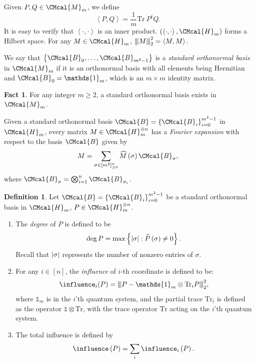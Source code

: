 \documentclass[10pt,a4paper]{article}
\def\B{\CMcal{B}}
\def\H{\CMcal{H}}
\def\M{\CMcal{M}}
\theoremstyle{plain}
\theoremstyle{definition}
\newtheorem{definition}[theorem]{Definition}
\newtheorem{fact}[theorem]{Fact}
\newcommand {\set} [1] {\ensuremath{ \left\lbrace #1 \right\rbrace }}
\newcommand {\innerproduct} [2] {\ensuremath{\left \langle #1 , #2 \right \rangle}}
\newcommand {\br} [1] {\ensuremath{ \left( #1 \right) }}
\DeclarePairedDelimiter{\abs}{\lvert}{\rvert}
\newcommand{\nnorm}[1]{{\left\vert\kern-0.25ex\left\vert\kern-0.25ex\left\vert #1
		\right\vert\kern-0.25ex\right\vert\kern-0.25ex\right\vert}}
\newcommand {\Tr} {\ensuremath{ \mathrm{Tr} }}
\newcommand {\id} {\ensuremath{\mathds{1}}}
\newcommand{\1}{\mathbb{1}} %
\begin{document}
	Given $P,Q\in\M_m$, we define
	\begin{equation}\label{eqn:innerproduct}	
	\innerproduct{P}{Q}=\frac{1}{m}\Tr~P^{\dagger}Q.
	\end{equation}
It is easy to verify that $\innerproduct{\cdot}{\cdot}$ is an inner product. $\br{\innerproduct{\cdot}{\cdot},\H_m}$ forms a Hilbert space. For any $M\in\H_m$, $\nnorm{M}_2^2=\innerproduct{M}{M}$.	


	We say that $\set{\B_0,\ldots,\B_{m^2-1}}$ is a {\em standard orthonormal basis} in $\M_m$ if it is an orthonormal basis with all elements being Hermitian and $\B_0=\id_m$, which is an $m\times m$ identity matrix.
 \begin{fact}\cite[Lemma 2.10]{qin2021nonlocal}\label{fact:fourier-expansion}
     For any integer $m\geq 2$, a standard orthonormal basis exists in $\M_m$. 
 \end{fact}
	
\par{Given a standard orthonormal basis $\B=\set{\B_i}_{i=0}^{m^2-1}$ in $\H_m$, every matrix $M\in\H_m^{\otimes n}$ has a {\em Fourier expansion} with respect to the basis $\B$ given by
\[M=\sum_{\sigma\in[m^2]_{\geq 0}^{n}}\widehat{M}\br{\sigma}\B_{\sigma},\] where $\B_{\sigma}=\bigotimes_{i=1}^n\B_{\sigma_i}$.
}
\par{
\begin{definition}\label{def:inf}
		Let $\B=\set{\B_i}_{i=0}^{m^2-1}$ be a standard orthonormal basis in $\H_m$, $P\in\H_m^{\otimes n}$.
		\begin{enumerate}
			\item The {\em degree} of $P$ is defined to be \[\deg P=\max\set{\abs{\sigma}:\widehat{P}\br{\sigma}\neq 0}.\]
Recall that $\abs{\sigma}$ represents the number of nonzero entries of $\sigma$.
            \item For any $i\in[n]$, the {\em influence} of $i$-th coordinate is defined to be: \[\influence_i(P)=\nnorm{P-\id_m \otimes \Tr_iP}_2^2,\]
            where $\id_m$ is in the $i$'th quantum system, and the partial trace $\Tr_i$  is defined as the operator $\id\otimes\Tr$, with the trace operator $\Tr$ acting on the $i$'th quantum system.
			\item The total influence is defined by\[\influence\br{P}=\sum_i\influence_i\br{P}.\]
		\end{enumerate}
	\end{definition}
 }
\end{document}
